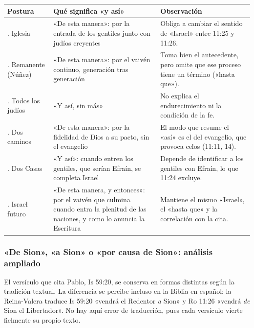 \documentclass[11pt,letterpaper]{article}
\begin{document}
\begin{center}\footnotesize
\renewcommand{\arraystretch}{1.25}
\begin{tabular}{>{\RaggedRight\arraybackslash}p{2.9cm}>{\RaggedRight\arraybackslash}p{4.4cm}>{\RaggedRight\arraybackslash}p{6.4cm}}
\toprule
\textbf{Postura} & \textbf{Qué significa «y así»} & \textbf{Observación}\\
\midrule
1. Iglesia & «De esta manera»: por la entrada de los gentiles junto con judíos creyentes & Obliga a cambiar el sentido de «Israel» entre 11:25 y 11:26.\\
2. Remanente (Núñez) & «De esta manera»: por el vaivén continuo, generación tras generación & Toma bien el antecedente, pero omite que ese proceso tiene un término («hasta que»).\\
3. Todos los judíos & «Y así, sin más» & No explica el endurecimiento ni la condición de la fe.\\
4. Dos caminos & «De esta manera»: por la fidelidad de Dios a su pacto, sin el evangelio & El modo que resume el «así» es el del evangelio, que provoca celos (11:11, 14).\\
5. Dos Casas & «Y así»: cuando entren los gentiles, que serían Efraín, se completa Israel & Depende de identificar a los gentiles con Efraín, lo que 11:24 excluye.\\
6. Israel futuro & «De esta manera, y entonces»: por el vaivén que culmina cuando entra la plenitud de las naciones, y como lo anuncia la Escritura & Mantiene el mismo «Israel», el «hasta que» y la correlación con la cita.\\
\bottomrule
\end{tabular}\end{center}

\subsubsection*{«De Sion», «a Sion» o «por causa de Sion»: análisis ampliado}

El versículo que cita Pablo, Is 59:20, se conserva en formas distintas según la tradición textual. La diferencia se percibe incluso en la Biblia en español: la Reina-Valera traduce Is 59:20 «vendrá el Redentor \emph{a} Sion» y Ro 11:26 «vendrá \emph{de} Sion el Libertador». No hay aquí error de traducción, pues cada versículo vierte fielmente su propio texto.
\end{document}
